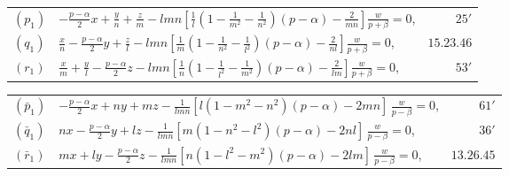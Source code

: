 \documentclass[11pt,a4paper]{book}
\begin{document}
\begin{center}
\begin{tabular}{@{}l@{\qquad}l@{\qquad}r@{}}
$(p_1)$ & $\displaystyle -\frac{p - \alpha}{2}x + \frac{y}{n} + \frac{z}{m} - lmn\left[\frac{1}{l}\left(1 - \frac{1}{m^2} - \frac{1}{n^2}\right)(p - \alpha) - \frac{2}{mn}\right]\frac{w}{p + \beta} = 0$, & $25'$ \\[4pt]
$(q_1)$ & $\displaystyle \frac{x}{n} - \frac{p - \alpha}{2}y + \frac{z}{l} - lmn\left[\frac{1}{m}\left(1 - \frac{1}{n^2} - \frac{1}{l^2}\right)(p - \alpha) - \frac{2}{nl}\right]\frac{w}{p + \beta} = 0$, & $15.23.46$ \\[4pt]
$(r_1)$ & $\displaystyle \frac{x}{m} + \frac{y}{l} - \frac{p - \alpha}{2}z - lmn\left[\frac{1}{n}\left(1 - \frac{1}{l^2} - \frac{1}{m^2}\right)(p - \alpha) - \frac{2}{lm}\right]\frac{w}{p + \beta} = 0$, & $53'$
\end{tabular}
\end{center}

\begin{center}
\begin{tabular}{@{}l@{\qquad}l@{\qquad}r@{}}
$(\bar{p}_1)$ & $\displaystyle -\frac{p - \alpha}{2}x + ny + mz - \frac{1}{lmn}[l(1 - m^2 - n^2)(p - \alpha) - 2mn]\,\frac{w}{p - \beta} = 0$, & $61'$ \\[4pt]
$(\bar{q}_1)$ & $\displaystyle nx - \frac{p - \alpha}{2}y + lz - \frac{1}{lmn}[m(1 - n^2 - l^2)(p - \alpha) - 2nl]\,\frac{w}{p - \beta} = 0$, & $36'$ \\[4pt]
$(\bar{r}_1)$ & $\displaystyle mx + ly - \frac{p - \alpha}{2}z - \frac{1}{lmn}[n(1 - l^2 - m^2)(p - \alpha) - 2lm]\,\frac{w}{p - \beta} = 0$, & $13.26.45$
\end{tabular}
\end{center}

\medskip
\end{document}
